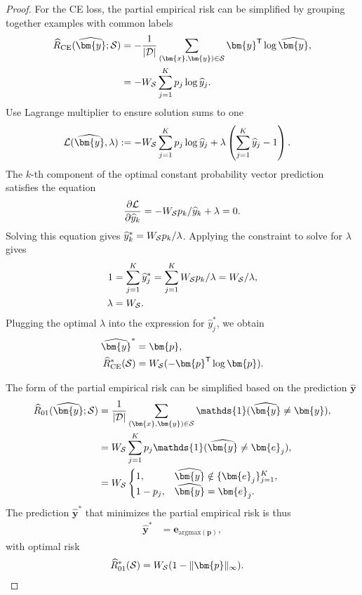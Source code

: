 \documentclass[letterpaper]{article} %
\newcommand{\bx}{{\bm{x}}}
\newcommand{\bp}{{\bm{p}}}
\newcommand{\by}{{\bm{y}}}
\newcommand{\be}{{\bm{e}}}
\newcommand{\T}{{\mathsf{T}}}
\newcommand{\I}{\mathds{1}}
\newcommand{\cS}{{\cal{S}}}
\newcommand{\cD}{{\cal{D}}}
\newcommand{\WS}{{W_{\cal{S}}}}
\newcommand{\argmax}{\mathrm{argmax}}
\begin{document}
\begin{proof}
    \medskip{}
    For the CE loss, the partial empirical risk can be simplified by grouping together examples with common labels
    \begin{align*}
        \widehat{R}_{\mathrm{CE}}(\widehat{\by};\cS) &=  -\frac{1}{|\cD|}\sum_{(\bx,\by)\in\cS} \by^\T \log \widehat{\by},
        \\
        &= -W_{\cS} \sum_{j=1}^K p_j\log \widehat{y}_j.
    \end{align*}
    Use Lagrange multiplier to ensure solution sums to one
    \begin{align*}
        \mathcal{L}(\widehat{\by},\lambda) &:= -W_{\cS} \sum_{j=1}^K p_j\log \widehat{y}_j + \lambda \left( \sum_{j=1}^K \widehat{y}_j - 1 \right).
    \end{align*}
    The $k$-th component of the optimal constant probability vector prediction satisfies the equation
    \begin{align*}
        \frac{\partial\mathcal{L}}{\partial\widehat{y}_k} = -W_{\cS}  p_k/\widehat{y}_k + \lambda=0.
    \end{align*}
    Solving this equation gives $\widehat{y}_k^* = \WS p_k/\lambda$. Applying the constraint to solve for $\lambda$ gives
    \begin{align*}
        1 &= \sum_{j=1}^K \widehat{y}_j^* = \sum_{j=1}^K \WS p_k/\lambda = \WS/\lambda,
        \\
        \lambda &= \WS.
    \end{align*}
    Plugging the optimal $\lambda$ into the expression for $\widehat{y}_j^*$, we obtain
    \begin{align*}
        \widehat{\by}^* &= \bp,
        \\
        \widehat{R}_{\mathrm{CE}}^*(\cS) &= \WS(-\bp^\T\log \bp).
    \end{align*}



    \medskip{}
    The form of the partial empirical risk can be simplified based on the prediction $\widehat{\by}$
    \begin{align*}
        \widehat{R}_{01}(\widehat{\by};\cS) &= \frac{1}{|\cD|}\sum_{(\bx,\by)\in\cS}  \I(\widehat{\by}\ne\by),
        \\
        &= \WS \sum_{j=1}^K p_j \I(\widehat{\by}\ne \be_j),
        \\
        &= \WS\begin{cases}
            1,& \widehat{\by} \notin \{\be_j\}_{j=1}^K, \\
            1-p_j,& \widehat{\by}=\be_j.
        \end{cases}
    \end{align*}
    The prediction $\widehat{\by}^*$ that minimizes the partial empirical risk is thus
    \begin{align*}
        \widehat{\by}^* &= \bm{e}_{\argmax(\bp)},
    \end{align*}
    with optimal risk
    \begin{align*}
        \widehat{R}_{01}^*(\cS) &= \WS(1-\|\bp\|_\infty).
    \end{align*}




\end{proof}
\end{document}
